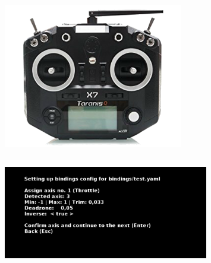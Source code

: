 \documentclass[aspectratio=169]{beamer}
\begin{document}
\begin{frame}[allowframebreaks]
\begin{columns}
\begin{column}{0.33\textwidth}
			\begin{figure}
				\centering
				\includegraphics[width=0.7\textwidth]{taranis.png}
			\end{figure}
		\end{column}
	\end{columns}
	
	\begin{figure}
		\centering
		\includegraphics[width=0.8\textwidth]{bindings.png}
	\end{figure}
\end{frame}
\end{document}
